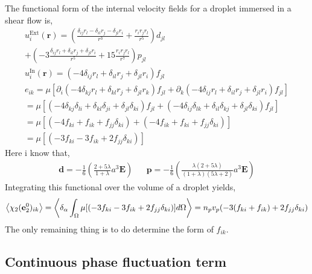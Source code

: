 The functional form of the internal velocity fields for a droplet immersed in a shear flow is,
\begin{align*}
    u_i^\text{Ext}(\textbf{r})
    = \left(\frac{\delta_{ij} r_l - \delta_{il} r_j - \delta_{jl} r_i}{r^3} 
    + \frac{r_ir_jr_l}{r^5}\right)  d_{jl}\\
    + \left(-3 \frac{\delta_{ij} r_l + \delta_{il} r_j + \delta_{jl} r_i}{r^5} 
    + 15\frac{r_ir_jr_l}{r^7}\right)  p_{jl}\\
    u_i^\text{In}(\textbf{r})
    = \left(- 4 \delta_{ij} r_l  + \delta_{il} r_j + \delta_{jl} r_i\right) f_{jl}\\
    e_{ik}
    = \mu [
        \partial_i \left(- 4 \delta_{kj} r_l  + \delta_{kl} r_j + \delta_{jl} r_k\right) f_{jl} + \partial_k \left(- 4 \delta_{ij} r_l  + \delta_{il} r_j + \delta_{jl} r_i\right) f_{jl} 
    ]\\
    = \mu [
        \left(- 4 \delta_{kj} \delta_{li}  + \delta_{kl} \delta_{ji} + \delta_{jl} \delta_{ki}\right) f_{jl} + \left(- 4 \delta_{ij} \delta_{lk}  + \delta_{il} \delta_{kj} + \delta_{jl} \delta_{ki}\right) f_{jl} 
    ]\\
    = \mu [
        \left(- 4 f_{ki}  + f_{ik} + f_{jj}\delta_{ki}\right)  + \left(- 4 f_{ik}  + f_{ki} + f_{jj} \delta_{ki}\right)  
    ]\\
    = \mu [
        \left(- 3 f_{ki}  - 3 f_{ik} +2 f_{jj}\delta_{ki}\right) 
    ]
\end{align*}
Here i know that, 
\begin{align*}
    \textbf{d}
    = - \frac{1}{6} \left(
        \frac{2+5\lambda}{1+\lambda}a^3 \textbf{E}
    \right)
    &&
    \textbf{p}
    = - \frac{1}{6} \left(
        \frac{\lambda(2+5\lambda)}{(1+\lambda)(5\lambda+2)}a^3 \textbf{E}
    \right)
\end{align*}
Integrating this functional over the volume of a droplet yields, 
\begin{equation}
    \left<\chi_2 (\textbf{e}_2^0)_{ik}\right>
    = \left<\delta_\alpha \int_{\Omega} 
        \mu [
        \left(- 3 f_{ki}  - 3 f_{ik} +2 f_{jj}\delta_{ki}\right) 
    ] d\Omega\right>
    = n_pv_p(-3 (f_{ki}+ f_{ik}) + 2 f_{jj} \delta_{ki})
\end{equation}
The only remaining thing is to do determine the form of $f_{ik}$. 


\subsection*{Continuous phase fluctuation term}

